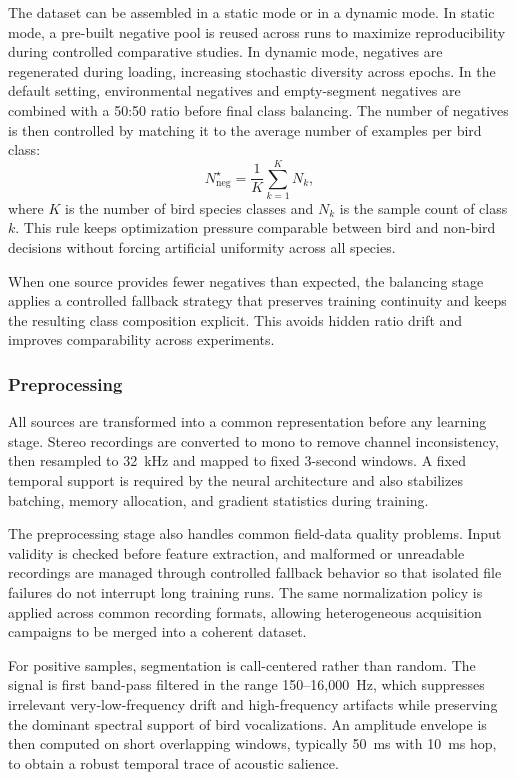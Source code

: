 \documentclass[a4paper,singleside,12pt]{report} %
\begin{document}
	The dataset can be assembled in a static mode or in a dynamic mode. In static mode, a pre-built negative pool is reused across runs to maximize reproducibility during controlled comparative studies. In dynamic mode, negatives are regenerated during loading, increasing stochastic diversity across epochs. In the default setting, environmental negatives and empty-segment negatives are combined with a 50:50 ratio before final class balancing. The number of negatives is then controlled by matching it to the average number of examples per bird class:
	\begin{equation}
		N_{\mathrm{neg}}^{\star} = \frac{1}{K}\sum_{k=1}^{K} N_k,
	\end{equation}
	where \(K\) is the number of bird species classes and \(N_k\) is the sample count of class \(k\). This rule keeps optimization pressure comparable between bird and non-bird decisions without forcing artificial uniformity across all species.

	When one source provides fewer negatives than expected, the balancing stage applies a controlled fallback strategy that preserves training continuity and keeps the resulting class composition explicit. This avoids hidden ratio drift and improves comparability across experiments.

	\subsubsection{Preprocessing}
	All sources are transformed into a common representation before any learning stage. Stereo recordings are converted to mono to remove channel inconsistency, then resampled to 32~kHz and mapped to fixed 3-second windows. A fixed temporal support is required by the neural architecture and also stabilizes batching, memory allocation, and gradient statistics during training.

	The preprocessing stage also handles common field-data quality problems. Input validity is checked before feature extraction, and malformed or unreadable recordings are managed through controlled fallback behavior so that isolated file failures do not interrupt long training runs. The same normalization policy is applied across common recording formats, allowing heterogeneous acquisition campaigns to be merged into a coherent dataset.

	For positive samples, segmentation is call-centered rather than random. The signal is first band-pass filtered in the range 150--16,000~Hz, which suppresses irrelevant very-low-frequency drift and high-frequency artifacts while preserving the dominant spectral support of bird vocalizations. An amplitude envelope is then computed on short overlapping windows, typically 50~ms with 10~ms hop, to obtain a robust temporal trace of acoustic salience.
\end{document}
